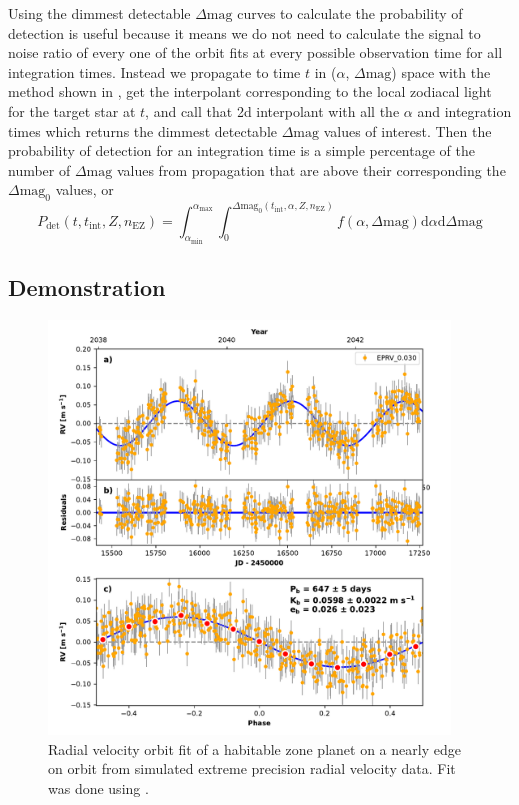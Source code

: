 Using the dimmest detectable $\Delta\textrm{mag}$ curves to calculate
the probability of detection is useful because it means we do not need to calculate
the signal to noise ratio of every one of the orbit fits at every possible
observation time for all integration times. Instead we propagate to time $t$ in
($\alpha$, $\Delta\textrm{mag}$) space with the method shown in
, get the interpolant corresponding to the local zodiacal
light for the target star at $t$, and call that 2d interpolant with all the
$\alpha$ and integration times which returns the dimmest detectable
$\Delta\textrm{mag}$ values of interest. Then the probability of detection for
an integration time is a simple percentage of the number of
$\Delta\textrm{mag}$ values from propagation that are above their corresponding
the $\Delta\textrm{mag}_0$ values, or
\begin{equation}
  P_\textrm{det}(t, t_\textrm{int}, Z, n_\textrm{EZ}) = 
  \int_{\alpha_\textrm{min}}^{\alpha_\textrm{max}} 
  \int_{0}^{\Delta\textrm{mag}_0(t_\textrm{int}, \alpha, Z, n_\textrm{EZ})}
  f(\alpha, \Delta\textrm{mag})\textrm{d}\alpha \textrm{d}\Delta\textrm{mag}
  \label{eq:comp_integral}
\end{equation}

\subsection{Demonstration}

\begin{figure}
  \begin{center}
    \includegraphics[width=0.95\textwidth]{ch3/figures/orbit_plot_mc_HIP_91438.pdf}
  \end{center}
  \caption{Radial velocity orbit fit of a habitable zone planet on a nearly edge on orbit from
  simulated extreme precision radial velocity data. Fit was done using
   \citep{fultonRadvelRadialVelocity2018}.}
  \label{fig:rv_fit}
\end{figure}

